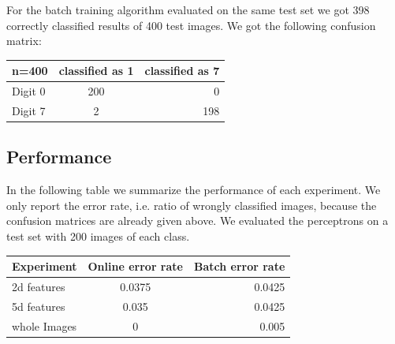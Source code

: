 For the batch training algorithm evaluated on the same test set we got 398 correctly classified results of 400 test images. We got the following confusion matrix:

\begin{tabular}{ l | c | r }
\centering
  n=400 & classified as 1 & classified as 7 \\ \hline
  Digit 0 & 200 & 0 \\
  Digit 7 & 2 & 198 \\
\end{tabular}

\subsection{Performance}
In the following table we summarize the performance of each experiment. We only report the error rate, i.e. ratio of wrongly classified images, because the confusion matrices are already given above. We evaluated the perceptrons on a test set with 200 images of each class.


\begin{tabular}{ l | c | r }
\centering
  Experiment & Online error rate & Batch error rate \\ \hline
  2d features & 0.0375 & 0.0425 \\
  5d features & 0.035 & 0.0425 \\
  whole Images  & 0 & 0.005 \\
\end{tabular}


